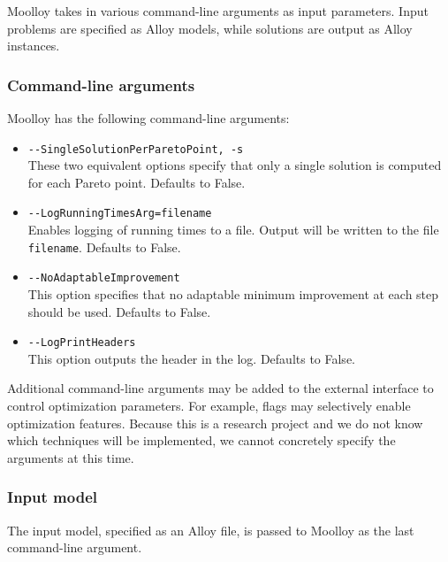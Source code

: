 \documentclass[11pt]{article}
\theoremstyle{definition}
\begin{document}
Moolloy takes in various command-line arguments as input parameters.
Input problems are specified as Alloy models, while solutions are
output as Alloy instances.

\subsubsection{Command-line arguments}\label{sec:cl_args}

Moolloy has the following command-line arguments:

\begin{itemize}
  \item \verb|--SingleSolutionPerParetoPoint, -s|\\
  These two equivalent options specify that only a single solution is
  computed for each Pareto point. Defaults to False.


  \item \verb|--LogRunningTimesArg=filename|\\
  Enables logging of running times to a file. Output will be written to the
  file \texttt{filename}. Defaults to False.

  \item \verb|--NoAdaptableImprovement|\\
  This option specifies that no adaptable minimum improvement at each
  step should be used. Defaults to False.

  \item \verb|--LogPrintHeaders|\\
  This option outputs the header in the log. Defaults to False.
\end{itemize}

Additional command-line arguments may be added to the external
interface to control optimization parameters. For example, flags may
selectively enable optimization features. Because this is a research
project and we do not know which techniques will be implemented, we
cannot concretely specify the arguments at this time.

\subsubsection{Input model}\label{sec:in_model}

The input model, specified as an Alloy file, is passed to Moolloy as
the last command-line argument.
\end{document}
